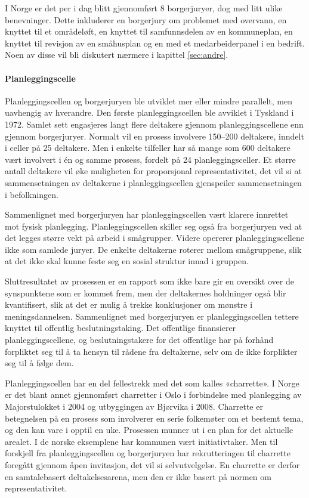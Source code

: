 \documentclass[
  12pt,
  a4paper, 12pt]{article}
\begin{document}
I Norge er det per i dag blitt gjennomført 8 borgerjuryer, dog med litt ulike benevninger. Dette inkluderer en borgerjury om problemet med overvann, en knyttet til et områdeløft, en knyttet til samfunnsdelen av en kommuneplan, en knyttet til revisjon av en småhusplan og en med et medarbeiderpanel i en bedrift. Noen av disse vil bli diskutert nærmere i kapittel \ref{sec:andre}.

\hypertarget{planleggingscelle}{%
\paragraph{Planleggingscelle}\label{planleggingscelle}}

Planleggingscellen og borgerjuryen ble utviklet mer eller mindre parallelt, men uavhengig av hverandre. Den første planleggingscellen ble avviklet i Tyskland i 1972. Samlet sett engasjeres langt flere deltakere gjennom planleggingscellene enn gjennom borgerjuryer. Normalt vil en prosess involvere 150--200 deltakere, inndelt i celler på 25 deltakere. Men i enkelte tilfeller har så mange som 600 deltakere vært involvert i én og samme prosess, fordelt på 24 planleggingsceller. Et større antall deltakere vil øke muligheten for proporsjonal representativitet, det vil si at sammensetningen av deltakerne i planleggingscellen gjenspeiler sammensetningen i befolkningen.

Sammenlignet med borgerjuryen har planleggingscellen vært klarere innrettet mot fysisk planlegging. Planleggingscellen skiller seg også fra borgerjuryen ved at det legges større vekt på arbeid i smågrupper. Videre opererer planleggingscellene ikke som samlede juryer. De enkelte deltakerne roterer mellom smågruppene, slik at det ikke skal kunne feste seg en sosial struktur innad i gruppen.

Sluttresultatet av prosessen er en rapport som ikke bare gir en oversikt over de synspunktene som er kommet frem, men der deltakernes holdninger også blir kvantifisert, slik at det er mulig å trekke konklusjoner om mønstre i meningsdannelsen. Sammenlignet med borgerjuryen er planleggingscellen tettere knyttet til offentlig beslutningstaking. Det offentlige finansierer planleggingscellene, og beslutningstakere for det offentlige har på forhånd forpliktet seg til å ta hensyn til rådene fra deltakerne, selv om de ikke forplikter seg til å følge dem.

Planleggingscellen har en del fellestrekk med det som kalles «charrette». I Norge er det blant annet gjennomført charretter i Oslo i forbindelse med planlegging av Majorstulokket i 2004 og utbyggingen av Bjørvika i 2008. Charrette er betegnelsen på en prosess som involverer en serie folkemøter om et bestemt tema, og den kan vare i opptil en uke. Prosessen munner ut i en plan for det aktuelle arealet. I de norske eksemplene har kommunen vært initiativtaker. Men til forskjell fra planleggingscellen og borgerjuryen har rekrutteringen til charrette foregått gjennom åpen invitasjon, det vil si selvutvelgelse. En charrette er derfor en samtalebasert deltakelsesarena, men den er ikke basert på normen om representativitet.
\end{document}
